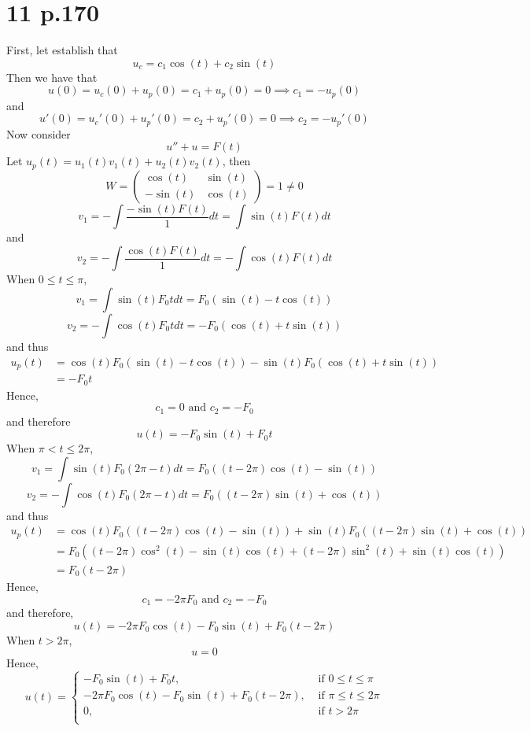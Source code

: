 \documentclass[11pt]{article}
\begin{document}
\section*{11 p.170}
First, let establish that 
\[
    u_c = c_1 \cos(t) + c_2 \sin(t)    
\]
Then we have that 
\[
    u(0) = u_c(0) + u_p(0) = c_1 + u_p(0) = 0 \implies c_1 = -u_p(0) 
\]
and 
\[
    u'(0) = u_c'(0) + u_p'(0) = c_2 + u_p'(0) = 0 \implies c_2 = -u_p'(0)
\]
Now consider 
\[
    u'' + u = F(t)    
\]
Let $u_p(t) = u_1(t)v_1(t) + u_2(t)v_2(t)$, then 
\[
    W = 
    \begin{pmatrix}
        \cos(t) & \sin(t) \\
        -\sin(t) & \cos(t)    
    \end{pmatrix} 
    = 1 \ne 0 
\]
\[
    v_1 = - \int \frac{-\sin(t)F(t)}{1} dt = \int \sin(t) F(t) dt
\]
and 
\[
    v_2 = - \int \frac{\cos(t)F(t)}{1} dt = -\int \cos(t) F(t) dt
\]
When $0\le t \le \pi$, 
\[
    v_1 = \int \sin(t) F_0 t dt = F_0(\sin(t) - t\cos(t))
\]
\[
    v_2 = -\int \cos(t) F_0 t dt = -F_0(\cos(t) + t\sin(t))
\]
and thus 
\begin{equation*}
    \begin{aligned}
        u_p(t) &= \cos(t) F_0 (\sin(t) - t\cos(t)) - \sin(t) F_0 (\cos(t) + t\sin(t)) \\
        &= -F_0 t
    \end{aligned}
\end{equation*}
Hence, 
\[
    c_1 = 0 \text{ and } c_2 = -F_0    
\]
and therefore 
\[
    u(t) = -F_0\sin(t) + F_0t    
\]
When $\pi < t \le 2\pi$, 
\[
    v_1 = \int \sin(t) F_0 (2\pi- t)dt = F_0 ((t-2{\pi})\cos(t)-\sin(t))
\]
\[
    v_2 = -\int \cos(t) F_0 (2\pi-t) dt =  F_0 ((t-2{\pi})\sin(t)+ \cos(t))
\]
and thus 
\begin{equation*}
    \begin{aligned}
        u_p(t) &= \cos(t) F_0((t-2{\pi})\cos(t)-\sin(t)) + \sin(t) F_0 ((t-2{\pi})\sin(t)+ \cos(t)) \\
        &= F_0 ((t-2\pi)\cos^2(t) - \sin(t)\cos(t) + (t-2\pi)\sin^2(t) + \sin(t)\cos(t)) \\
        &= F_0(t-2\pi)
    \end{aligned}
\end{equation*}
Hence, 
\[
    c_1 = -2\pi F_0 \text{ and } c_2 = -F_0
\]
and therefore, 
\[
    u(t) = -2\pi F_0 \cos(t) - F_0 \sin(t) + F_0(t-2\pi)    
\]
When $t > 2\pi$, 
\[
    u = 0
\]
Hence, 
\[
    u(t) = 
    \begin{cases}
        -F_0\sin(t) + F_0t   , &\text{ if } 0 \le t \le \pi \\
        -2\pi F_0 \cos(t) - F_0 \sin(t) + F_0(t-2\pi), &\text{ if } \pi \le t \le 2\pi \\
        0, &\text{ if } t > 2\pi \\
    \end{cases}    
\]
\end{document}
